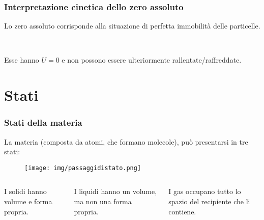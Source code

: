 \documentclass[]{beamer}
\theoremstyle{plain}
\begin{document}
\begin{frame}
\frametitle{Interpretazione cinetica dello zero assoluto}
Lo zero assoluto corrisponde alla situazione di \alert<1>{perfetta immobilità delle particelle}.\pause

~

Esse hanno $ U = 0 $ e \alert{non possono essere ulteriormente rallentate/raffreddate}.


\begin{figure}\centering
{}
\end{figure}
\end{frame}



\section{Stati}



\begin{frame}
\frametitle{Stati della materia}
La materia (composta da atomi, che formano molecole), può presentarsi in tre stati:
\begin{figure}
\texttt{[image: img/passaggidistato.png]}
\end{figure}
\begin{columns}
\begin{column}{0.3\textwidth}
\begin{center}
I solidi hanno volume e forma propria.\\~
\end{center}
\end{column}
\begin{column}{0.3\textwidth}
\begin{center}
I liquidi hanno un volume, ma non una forma propria.\\~
\end{center}
\end{column}
\begin{column}{0.3\textwidth}
\begin{center}
I gas occupano tutto lo spazio del recipiente che li contiene.
\end{center}
\end{column}
\end{columns}
\end{frame}
\end{document}
